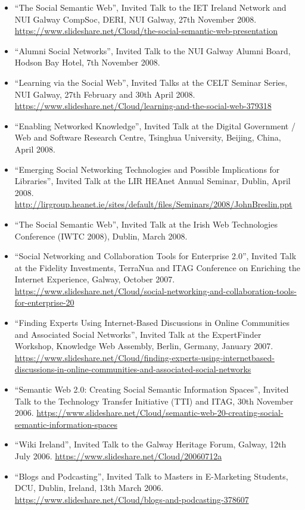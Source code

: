 \documentclass[10pt,a4paper]{res} %
\begin{document}
\begin{resume}
\begin{itemize}
\item ``The Social Semantic Web'', Invited Talk to the IET Ireland Network and NUI Galway CompSoc, DERI, NUI Galway, 27th November 2008. \url{https://www.slideshare.net/Cloud/the-social-semantic-web-presentation}
\item ``Alumni Social Networks'', Invited Talk to the NUI Galway Alumni Board, Hodson Bay Hotel, 7th November 2008.
\item ``Learning via the Social Web'', Invited Talks at the CELT Seminar Series, NUI Galway, 27th February and 30th April 2008. \url{https://www.slideshare.net/Cloud/learning-and-the-social-web-379318}
\item ``Enabling Networked Knowledge'', Invited Talk at the Digital Government / Web and Software Research Centre, Tsinghua University, Beijing, China, April 2008. %
\item ``Emerging Social Networking Technologies and Possible Implications for Libraries'', Invited Talk at the LIR HEAnet Annual Seminar, Dublin, April 2008. \url{http://lirgroup.heanet.ie/sites/default/files/Seminars/2008/JohnBreslin.ppt}
\item ``The Social Semantic Web'', Invited Talk at the Irish Web Technologies Conference (IWTC 2008), Dublin, March 2008. %
\item ``Social Networking and Collaboration Tools for Enterprise 2.0'', Invited Talk at the Fidelity Investments, TerraNua and ITAG Conference on Enriching the Internet Experience, Galway, October 2007. \url{https://www.slideshare.net/Cloud/social-networking-and-collaboration-tools-for-enterprise-20}
\item ``Finding Experts Using Internet-Based Discussions in Online Communities and Associated Social Networks'', Invited Talk at the ExpertFinder Workshop, Knowledge Web Assembly, Berlin, Germany, January 2007. \url{https://www.slideshare.net/Cloud/finding-experts-using-internetbased-discussions-in-online-communities-and-associated-social-networks}
\item ``Semantic Web 2.0: Creating Social Semantic Information Spaces'', Invited Talk to the Technology Transfer Initiative (TTI) and ITAG, 30th November 2006. \url{https://www.slideshare.net/Cloud/semantic-web-20-creating-social-semantic-information-spaces}
\item ``Wiki Ireland'', Invited Talk to the Galway Heritage Forum, Galway, 12th July 2006. \url{https://www.slideshare.net/Cloud/20060712a}
\item ``Blogs and Podcasting'', Invited Talk to Masters in E-Marketing Students, DCU, Dublin, Ireland, 13th March 2006. \url{https://www.slideshare.net/Cloud/blogs-and-podcasting-378607}

\end{itemize}
\end{resume}
\end{document}
